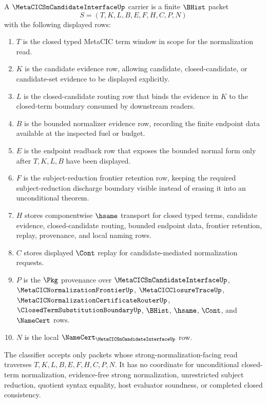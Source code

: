\begin{definition}
\label{def:metacic-sn-candidate-carrier}
A $\MetaCICSnCandidateInterfaceUp$ carrier is a finite $\BHist$ packet
$$
S=(T,K,L,B,E,F,H,C,P,N)
$$
with the following displayed rows:
\begin{enumerate}
\item $T$ is the closed typed MetaCIC term window in scope for the normalization read.
\item $K$ is the candidate evidence row, allowing candidate, closed-candidate, or candidate-set evidence to be displayed explicitly.
\item $L$ is the closed-candidate routing row that binds the evidence in $K$ to the closed-term boundary consumed by downstream readers.
\item $B$ is the bounded normalizer evidence row, recording the finite endpoint data available at the inspected fuel or budget.
\item $E$ is the endpoint readback row that exposes the bounded normal form only after $T,K,L,B$ have been displayed.
\item $F$ is the subject-reduction frontier retention row, keeping the required subject-reduction discharge boundary visible instead of erasing it into an unconditional theorem.
\item $H$ stores componentwise $\hsame$ transport for closed typed terms, candidate evidence, closed-candidate routing, bounded endpoint data, frontier retention, replay, provenance, and local naming rows.
\item $C$ stores displayed $\Cont$ replay for candidate-mediated normalization requests.
\item $P$ is the $\Pkg$ provenance over $\MetaCICSnCandidateInterfaceUp$, $\MetaCICNormalizationFrontierUp$, $\MetaCICClosureTraceUp$, $\MetaCICNormalizationCertificateRouterUp$, $\ClosedTermSubstitutionBoundaryUp$, $\BHist$, $\hsame$, $\Cont$, and $\NameCert$ rows.
\item $N$ is the local $\NameCert_{\MetaCICSnCandidateInterfaceUp}$ row.
\end{enumerate}
The classifier accepts only packets whose strong-normalization-facing read traverses $T,K,L,B,E,F,H,C,P,N$. It has no coordinate for unconditional closed-term normalization, evidence-free strong normalization, unrestricted subject reduction, quotient syntax equality, host evaluator soundness, or completed closed consistency.
\end{definition}

